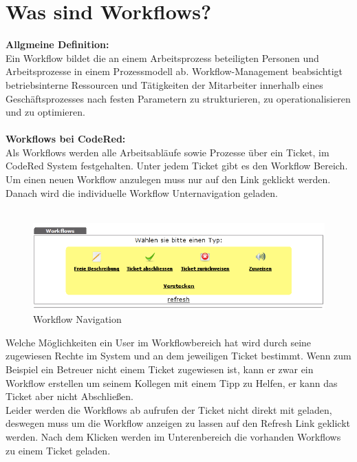 \chapter{Was sind Workflows?}  %
\label{chapter:Was sind Workflows?}  %

\textbf{Allgmeine Definition:}\\
Ein Workflow bildet die an einem Arbeitsprozess beteiligten Personen und Arbeitsprozesse in einem Prozessmodell ab. Workflow-Management beabsichtigt betriebsinterne Ressourcen und Tätigkeiten der Mitarbeiter innerhalb eines Geschäftsprozesses nach festen Parametern zu strukturieren, zu operationalisieren und zu optimieren.\\
\\
\textbf{Workflows bei CodeRed:}\\
Als Workflows werden alle Arbeitsabläufe sowie Prozesse über ein Ticket, im CodeRed System festgehalten. Unter jedem Ticket gibt es den Workflow Bereich. Um einen neuen Workflow anzulegen muss nur auf den Link geklickt werden. Danach wird die individuelle Workflow Unternavigation geladen. \\
\\
\begin{figure}[h!]
\begin{center}
   \includegraphics[width=400pt]{../bilder/workflow_navi_neu.png}
   \caption{Workflow Navigation}
   \label{Workflow Navigation}
\end{center}
\end{figure}
Welche Möglichkeiten ein User im Workflowbereich hat wird durch seine zugewiesen Rechte im System und an dem jeweiligen Ticket bestimmt. Wenn zum Beispiel ein Betreuer nicht einem Ticket zugewiesen ist, kann er zwar ein Workflow erstellen um seinem Kollegen mit einem Tipp zu Helfen, er kann das Ticket aber nicht Abschließen.\\
\newpage
Leider werden die Workflows ab aufrufen der Ticket nicht direkt mit geladen, deswegen muss um die Workflow anzeigen zu lassen auf den Refresh Link geklickt werden. Nach dem Klicken werden im Unterenbereich die vorhanden Workflows zu einem Ticket geladen.\\
